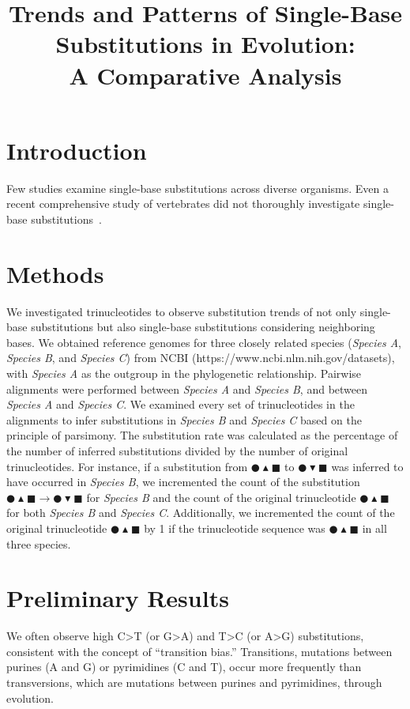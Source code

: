 \documentclass{article}
\title{Trends and Patterns of Single-Base Substitutions in Evolution:\\ A Comparative Analysis}
\date{}
\newcommand{\Cir}{\CIRCLE} %
\newcommand{\Tri}{\blacktriangle} %
\newcommand{\dTri}{\blacktriangledown} %
\newcommand{\Squ}{\blacksquare} %
\begin{document}
\maketitle

\section{Introduction}

Few studies examine single-base substitutions across diverse organisms. Even a recent comprehensive study of vertebrates did not thoroughly investigate single-base substitutions~\cite{bergeron2023evolution}.

\section{Methods}
We investigated trinucleotides to observe substitution trends of not only single-base substitutions but also single-base substitutions considering neighboring bases. We obtained reference genomes for three closely related species (\textit{Species A}, \textit{Species B}, and \textit{Species C}) from NCBI (https://www.ncbi.nlm.nih.gov/datasets), with \textit{Species A} as the outgroup in the phylogenetic relationship. Pairwise alignments were performed between \textit{Species A} and \textit{Species B}, and between \textit{Species A} and \textit{Species C}. We examined every set of trinucleotides in the alignments to infer substitutions in \textit{Species B} and \textit{Species C} based on the principle of parsimony. The substitution rate was calculated as the percentage of the number of inferred substitutions divided by the number of original trinucleotides. For instance, if a substitution from $\Cir\Tri\Squ$ to $\Cir\dTri\Squ$ was inferred to have occurred in \textit{Species B}, we incremented the count of the substitution $\Cir\Tri\Squ \rightarrow \Cir\dTri\Squ$ for \textit{Species B} and the count of the original trinucleotide $\Cir\Tri\Squ$ for both \textit{Species B} and \textit{Species C}. Additionally, we incremented the count of the original trinucleotide $\Cir\Tri\Squ$ by 1 if the trinucleotide sequence was $\Cir\Tri\Squ$ in all three species.

\section{Preliminary Results}
We often observe high C>T (or G>A) and T>C (or A>G) substitutions, consistent with the concept of ``transition bias.'' Transitions, mutations between purines (A and G) or pyrimidines (C and T), occur more frequently than transversions, which are mutations between purines and pyrimidines, through evolution.
\end{document}
